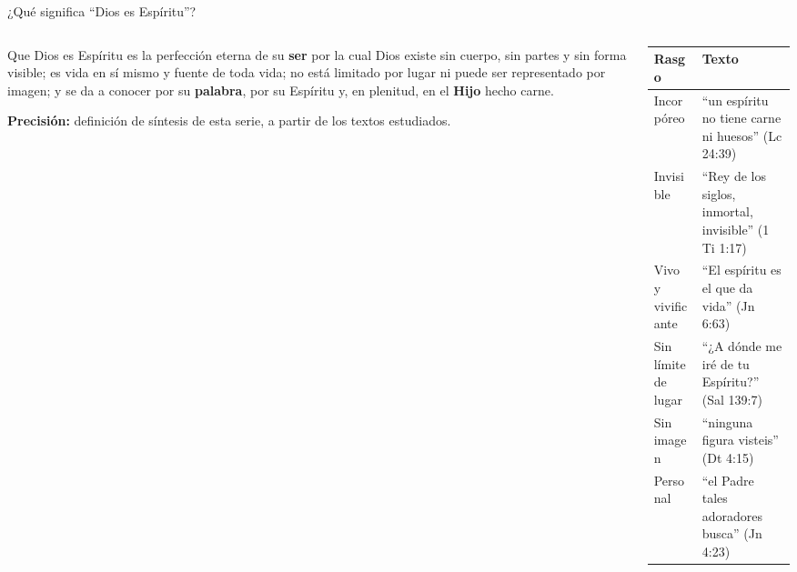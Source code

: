 \documentclass[hyperref={bookmarks=false},aspectratio=169]{beamer}
\newcommand{\destacar}[1]{\textbf{\textcolor{azul}{#1}}}
\newcommand{\precision}[1]{{\footnotesize\color{gris}\textbf{Precisión:} #1}}
\begin{document}
\begin{frame}{¿Qué significa ``Dios es Espíritu''?}
\begin{columns}[c,onlytextwidth]
\begin{column}{0.48\textwidth}
\begin{tcolorbox}[colback=papiro,colframe=azul,boxrule=1pt,arc=3pt,title={\small Definición},colbacktitle=azul,coltitle=papiro]
\small Que Dios es Espíritu es la perfección eterna de su \destacar{ser} por la cual Dios existe sin cuerpo, sin partes y sin forma visible; es vida en sí mismo y fuente de toda vida; no está limitado por lugar ni puede ser representado por imagen; y se da a conocer por su \destacar{palabra}, por su Espíritu y, en plenitud, en el \destacar{Hijo} hecho carne.
\end{tcolorbox}
\precision{definición de síntesis de esta serie, a partir de los textos estudiados.}
\end{column}
\begin{column}{0.50\textwidth}
\scriptsize\renewcommand{\arraystretch}{1.15}
\begin{tabular}{@{}>{\RaggedRight\arraybackslash}p{2.0cm}>{\RaggedRight\arraybackslash}p{4.2cm}@{}}
\toprule
\textbf{Rasgo} & \textbf{Texto} \\ \midrule
Incorpóreo & ``un espíritu no tiene carne ni huesos'' (Lc 24:39) \\
Invisible & ``Rey de los siglos, inmortal, invisible'' (1 Ti 1:17) \\
Vivo y vivificante & ``El espíritu es el que da vida'' (Jn 6:63) \\
Sin límite de lugar & ``¿A dónde me iré de tu Espíritu?'' (Sal 139:7) \\
Sin imagen & ``ninguna figura visteis'' (Dt 4:15) \\
Personal & ``el Padre tales adoradores busca'' (Jn 4:23) \\
\bottomrule
\end{tabular}
\end{column}
\end{columns}
\end{frame}
\end{document}
